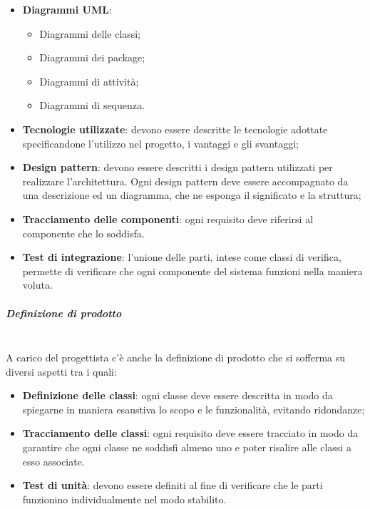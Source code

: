 			\begin{itemize}
				\item \textbf{Diagrammi UML}:
				\begin{itemize}
					\item Diagrammi delle classi;
					\item Diagrammi dei package;
					\item Diagrammi di attività;
					\item Diagrammi di sequenza.
				\end{itemize}
				\item \textbf{Tecnologie utilizzate}: devono essere descritte le tecnologie adottate specificandone l'utilizzo nel progetto, i vantaggi e gli svantaggi;
				\item \textbf{Design pattern}: devono essere descritti i design pattern utilizzati per realizzare l'architettura. Ogni design pattern deve essere accompagnato da una descrizione ed un diagramma, che ne esponga il significato e la struttura;
				\item \textbf{Tracciamento delle componenti}: ogni requisito deve riferirsi al componente che lo soddisfa.
				\item \textbf{Test di integrazione}: l'unione delle parti, intese come classi di verifica, permette di verificare che ogni componente del sistema funzioni nella maniera voluta.
			\end{itemize}
			\subparagraph{Definizione di prodotto} \mbox{}\\
			A carico del progettista c'è anche la definizione di prodotto che si sofferma su diversi aspetti tra i quali:
			\begin{itemize}
				\item \textbf{Definizione delle classi}: ogni classe deve essere descritta in modo da spiegarne in maniera esaustiva lo scopo e le funzionalità, evitando ridondanze;
				\item \textbf{Tracciamento delle classi}: ogni requisito deve essere tracciato in modo da garantire che ogni classe ne soddisfi almeno uno e poter risalire alle classi a esso associate.
				\item \textbf{Test di unità}: devono essere definiti al fine di verificare che le parti funzionino individualmente nel modo stabilito.
			\end{itemize}
